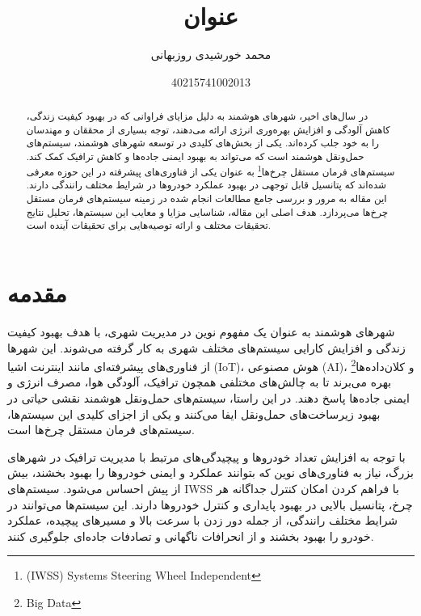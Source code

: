 \documentclass[a4paper,10pt]{article}
\title{عنوان}
\author{محمد خورشیدی روزبهانی\and 40215741002013}
\date{}
\begin{document}
    \maketitle

    \begin{abstract}
        
        در سال‌های اخیر، شهرهای هوشمند به دلیل مزایای فراوانی که در بهبود کیفیت زندگی، کاهش آلودگی و افزایش بهره‌وری انرژی ارائه می‌دهند، توجه بسیاری از محققان و مهندسان را به خود جلب کرده‌اند. یکی از بخش‌های کلیدی در توسعه شهرهای هوشمند، سیستم‌های حمل‌ونقل هوشمند است که می‌تواند به بهبود ایمنی جاده‌ها و کاهش ترافیک کمک کند. سیستم‌های فرمان مستقل چرخ‌ها\footnote{\hspace{2pt}(IWSS) Systems Steering Wheel Independent} به عنوان یکی از فناوری‌های پیشرفته در این حوزه معرفی شده‌اند که پتانسیل قابل توجهی در بهبود عملکرد خودروها در شرایط مختلف رانندگی دارند. این مقاله به مرور و بررسی جامع مطالعات انجام شده در زمینه سیستم‌های فرمان مستقل چرخ‌ها می‌پردازد. هدف اصلی این مقاله، شناسایی مزایا و معایب این سیستم‌ها، تحلیل نتایج تحقیقات مختلف و ارائه توصیه‌هایی برای تحقیقات آینده است.

    \end{abstract}
    
    \section{مقدمه}

        شهرهای هوشمند به عنوان یک مفهوم نوین در مدیریت شهری، با هدف بهبود کیفیت زندگی و افزایش کارایی سیستم‌های مختلف شهری به کار گرفته می‌شوند. این شهرها از فناوری‌های پیشرفته‌ای مانند اینترنت اشیا (IoT)، هوش مصنوعی (AI)، و کلان‌داده‌ها\footnote{\hspace{2pt}Big Data} بهره می‌برند تا به چالش‌های مختلفی همچون ترافیک، آلودگی هوا، مصرف انرژی و ایمنی جاده‌ها پاسخ دهند. در این راستا، سیستم‌های حمل‌ونقل هوشمند نقشی حیاتی در بهبود زیرساخت‌های حمل‌ونقل ایفا می‌کنند و یکی از اجزای کلیدی این سیستم‌ها، سیستم‌های فرمان مستقل چرخ‌ها است.

        با توجه به افزایش تعداد خودروها و پیچیدگی‌های مرتبط با مدیریت ترافیک در شهرهای بزرگ، نیاز به فناوری‌های نوین که بتوانند عملکرد و ایمنی خودروها را بهبود بخشند، بیش از پیش احساس می‌شود. سیستم‌های IWSS با فراهم کردن امکان کنترل جداگانه هر چرخ، پتانسیل بالایی در بهبود پایداری و کنترل خودروها دارند. این سیستم‌ها می‌توانند در شرایط مختلف رانندگی، از جمله دور زدن با سرعت بالا و مسیرهای پیچیده، عملکرد خودرو را بهبود بخشند و از انحرافات ناگهانی و تصادفات جاده‌ای جلوگیری کنند.
\end{document}
